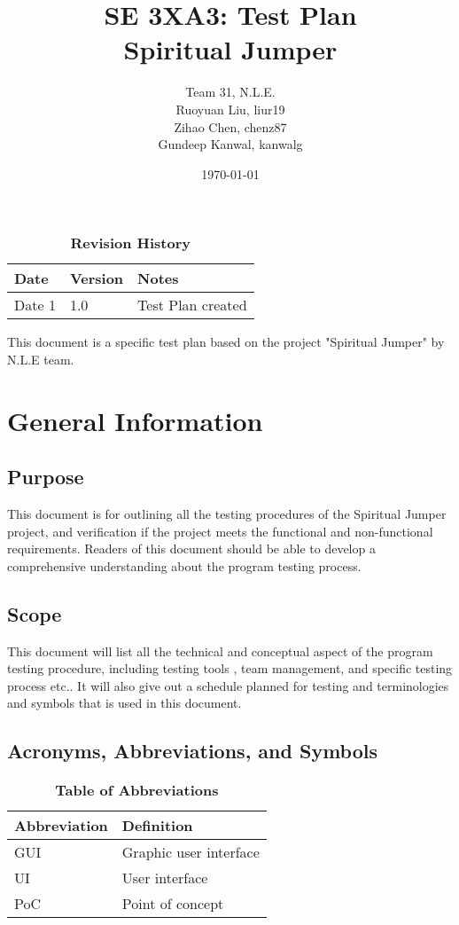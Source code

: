 \documentclass[12pt, titlepage]{article}
\title{SE 3XA3: Test Plan\\Spiritual Jumper}
\author{Team 31, N.L.E.
		\\ Ruoyuan Liu, liur19
		\\ Zihao Chen, chenz87
		\\ Gundeep Kanwal, kanwalg
}
\date{\today}
\begin{document}
\maketitle

\tableofcontents
\listoftables
\listoffigures

\begin{table}[bp]
\caption{\bf Revision History}
\begin{tabularx}{\textwidth}{p{3cm}p{2cm}X}
\toprule {\bf Date} & {\bf Version} & {\bf Notes}\\
\midrule
Date 1 & 1.0 & Test Plan created\\
\bottomrule
\end{tabularx}
\end{table}

\newpage


This document is a specific test plan based on the project "Spiritual Jumper" by N.L.E team.

\section{General Information}

\subsection{Purpose}
This document is for outlining all the testing procedures of the Spiritual Jumper project, and verification if the project meets the functional and non-functional requirements. Readers of this document should be able to develop a comprehensive understanding about the program testing process.
\subsection{Scope}
This document will list all the technical and conceptual aspect of the program testing procedure, including testing tools , team management, and specific testing process etc.. It will also give out a schedule planned for testing and terminologies and symbols that is used in this document.
\subsection{Acronyms, Abbreviations, and Symbols}

\begin{table}[hbp]
\caption{\textbf{Table of Abbreviations}} \label{Table}

\begin{tabularx}{\textwidth}{p{3cm}X}
\toprule
\textbf{Abbreviation} & \textbf{Definition} \\
\midrule
GUI & Graphic user interface\\
UI & User interface\\
PoC & Point of concept\\

\bottomrule
\end{tabularx}

\end{table}
\end{document}

